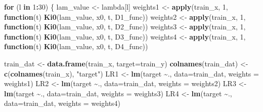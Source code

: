 \documentclass[
]{article}
\newenvironment{Shaded}{\begin{snugshade}}{\end{snugshade}}
\newcommand{\AttributeTok}[1]{\textcolor[rgb]{0.13,0.29,0.53}{#1}}
\newcommand{\ControlFlowTok}[1]{\textcolor[rgb]{0.13,0.29,0.53}{\textbf{#1}}}
\newcommand{\DecValTok}[1]{\textcolor[rgb]{0.00,0.00,0.81}{#1}}
\newcommand{\FunctionTok}[1]{\textcolor[rgb]{0.13,0.29,0.53}{\textbf{#1}}}
\newcommand{\NormalTok}[1]{#1}
\newcommand{\OtherTok}[1]{\textcolor[rgb]{0.56,0.35,0.01}{#1}}
\newcommand{\SpecialCharTok}[1]{\textcolor[rgb]{0.81,0.36,0.00}{\textbf{#1}}}
\newcommand{\StringTok}[1]{\textcolor[rgb]{0.31,0.60,0.02}{#1}}
\begin{document}
\begin{Shaded}
\begin{Highlighting}[]
      \ControlFlowTok{for}\NormalTok{ (l }\ControlFlowTok{in} \DecValTok{1}\SpecialCharTok{:}\DecValTok{30}\NormalTok{) \{}
\NormalTok{        lam\_value }\OtherTok{\textless{}{-}}\NormalTok{ lambda[l]}
\NormalTok{        weights1 }\OtherTok{\textless{}{-}} \FunctionTok{apply}\NormalTok{(train\_x, }\DecValTok{1}\NormalTok{, }\ControlFlowTok{function}\NormalTok{(t) }\FunctionTok{Ki0}\NormalTok{(lam\_value, x0, t, D1\_func))}
\NormalTok{        weights2 }\OtherTok{\textless{}{-}} \FunctionTok{apply}\NormalTok{(train\_x, }\DecValTok{1}\NormalTok{, }\ControlFlowTok{function}\NormalTok{(t) }\FunctionTok{Ki0}\NormalTok{(lam\_value, x0, t, D2\_func))}
\NormalTok{        weights3 }\OtherTok{\textless{}{-}} \FunctionTok{apply}\NormalTok{(train\_x, }\DecValTok{1}\NormalTok{, }\ControlFlowTok{function}\NormalTok{(t) }\FunctionTok{Ki0}\NormalTok{(lam\_value, x0, t, D3\_func))}
\NormalTok{        weights4 }\OtherTok{\textless{}{-}} \FunctionTok{apply}\NormalTok{(train\_x, }\DecValTok{1}\NormalTok{, }\ControlFlowTok{function}\NormalTok{(t) }\FunctionTok{Ki0}\NormalTok{(lam\_value, x0, t, D4\_func))}
        
\NormalTok{        train\_dat }\OtherTok{\textless{}{-}} \FunctionTok{data.frame}\NormalTok{(train\_x, }\AttributeTok{target=}\NormalTok{train\_y)}
        \FunctionTok{colnames}\NormalTok{(train\_dat) }\OtherTok{\textless{}{-}} \FunctionTok{c}\NormalTok{(}\FunctionTok{colnames}\NormalTok{(train\_x), }\StringTok{"target"}\NormalTok{)}
\NormalTok{        LR1 }\OtherTok{\textless{}{-}} \FunctionTok{lm}\NormalTok{(target }\SpecialCharTok{\textasciitilde{}}\NormalTok{., }\AttributeTok{data=}\NormalTok{train\_dat, }\AttributeTok{weights =}\NormalTok{ weights1)}
\NormalTok{        LR2 }\OtherTok{\textless{}{-}} \FunctionTok{lm}\NormalTok{(target }\SpecialCharTok{\textasciitilde{}}\NormalTok{., }\AttributeTok{data=}\NormalTok{train\_dat, }\AttributeTok{weights =}\NormalTok{ weights2)}
\NormalTok{        LR3 }\OtherTok{\textless{}{-}} \FunctionTok{lm}\NormalTok{(target }\SpecialCharTok{\textasciitilde{}}\NormalTok{., }\AttributeTok{data=}\NormalTok{train\_dat, }\AttributeTok{weights =}\NormalTok{ weights3)}
\NormalTok{        LR4 }\OtherTok{\textless{}{-}} \FunctionTok{lm}\NormalTok{(target }\SpecialCharTok{\textasciitilde{}}\NormalTok{., }\AttributeTok{data=}\NormalTok{train\_dat, }\AttributeTok{weights =}\NormalTok{ weights4)}
        

\end{Highlighting}
\end{Shaded}
\end{document}
